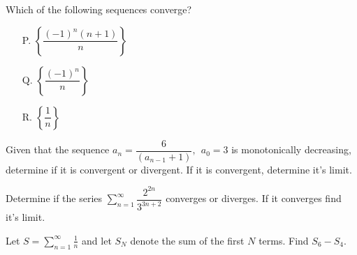 \documentclass{ximera}
\newcommand{\dsum}{\displaystyle\sum}
\begin{document}
\begin{problem}
    Which of the following sequences converge?
	\begin{enumerate}
		\item[P.] \(\left \{ \dfrac{(-1)^n(n+1)}{n}\right \}\)
	
		\item[Q.] \( \left \{ \dfrac{(-1)^n}{n} \right \} \)
		
		\item[R.] \(\left \{ \dfrac{1}{n} \right \} \)
	\end{enumerate}
\begin{multipleChoice}
\end{multipleChoice}
\end{problem}


\begin{problem}%
    Given that the sequence $a_n = \dfrac{6}{(a_{n-1}+1)}, \ \ a_0 = 3$ is monotonically decreasing, determine if it is convergent or divergent. If it is convergent, determine it's limit.
\begin{multipleChoice}
\choice{$\infty$}
\end{multipleChoice}
\end{problem}


\begin{problem}%
Determine if the series $\dsum\limits_{n=1}^{\infty} \dfrac{2^{2n}}{3^{3n + 2}}$ converges or diverges. If it converges find it's limit.
\begin{multipleChoice}
\end{multipleChoice}
\end{problem}

\begin{problem}
Let $S= \displaystyle \sum_{n=1}^\infty \frac 1 n$ and let $S_N$ denote the sum of the first $N$ terms. Find $S_6-S_4$.
\begin{multipleChoice} %
\end{multipleChoice}
\end{problem}
\end{document}
